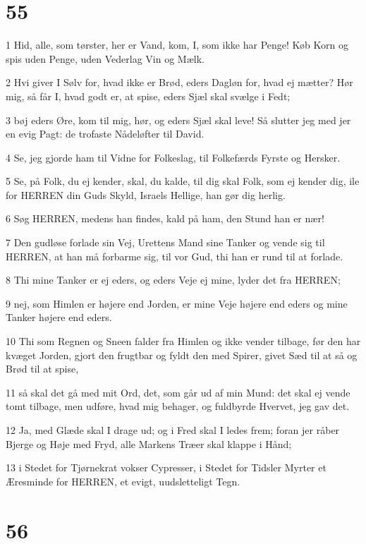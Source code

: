 \chapter{55}

\par 1 Hid, alle, som tørster, her er Vand, kom, I, som ikke har Penge! Køb Korn og spis uden Penge, uden Vederlag Vin og Mælk.
\par 2 Hvi giver I Sølv for, hvad ikke er Brød, eders Dagløn for, hvad ej mætter? Hør mig, så får I, hvad godt er, at spise, eders Sjæl skal svælge i Fedt;
\par 3 bøj eders Øre, kom til mig, hør, og eders Sjæl skal leve! Så slutter jeg med jer en evig Pagt: de trofaste Nådeløfter til David.
\par 4 Se, jeg gjorde ham til Vidne for Folkeslag, til Folkefærds Fyrste og Hersker.
\par 5 Se, på Folk, du ej kender, skal, du kalde, til dig skal Folk, som ej kender dig, ile for HERREN din Guds Skyld, Israels Hellige, han gør dig herlig.
\par 6 Søg HERREN, medens han findes, kald på ham, den Stund han er nær!
\par 7 Den gudløse forlade sin Vej, Urettens Mand sine Tanker og vende sig til HERREN, at han må forbarme sig, til vor Gud, thi han er rund til at forlade.
\par 8 Thi mine Tanker er ej eders, og eders Veje ej mine, lyder det fra HERREN;
\par 9 nej, som Himlen er højere end Jorden, er mine Veje højere end eders og mine Tanker højere end eders.
\par 10 Thi som Regnen og Sneen falder fra Himlen og ikke vender tilbage, før den har kvæget Jorden, gjort den frugtbar og fyldt den med Spirer, givet Sæd til at så og Brød til at spise,
\par 11 så skal det gå med mit Ord, det, som går ud af min Mund: det skal ej vende tomt tilbage, men udføre, hvad mig behager, og fuldbyrde Hvervet, jeg gav det.
\par 12 Ja, med Glæde skal I drage ud; og i Fred skal I ledes frem; foran jer råber Bjerge og Høje med Fryd, alle Markens Træer skal klappe i Hånd;
\par 13 i Stedet for Tjørnekrat vokser Cypresser, i Stedet for Tidsler Myrter et Æresminde for HERREN, et evigt, uudsletteligt Tegn.

\chapter{56}

